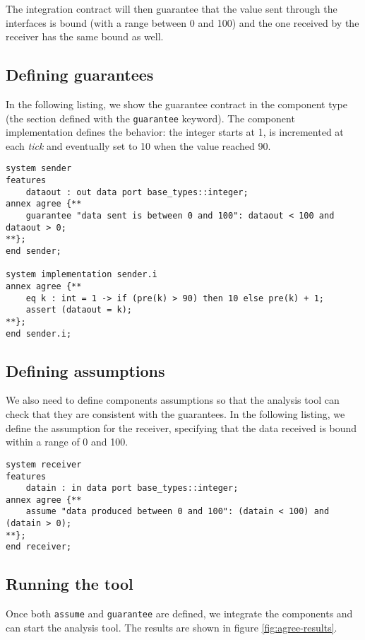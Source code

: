 \documentclass[times, 10pt]{article}
\begin{document}
The integration contract will then guarantee that the value sent through
the interfaces is bound (with a range between 0 and 100) and the one received
by the receiver has the same bound as well.

    \subsection{Defining guarantees}
    In the following listing, we show the guarantee contract in the component type
    (the section defined with the \texttt{guarantee} keyword). The component
    implementation defines the behavior: the integer starts at 1, is incremented at
    each \textit{tick} and eventually set to 10 when the value reached 90.

    \begin{lstlisting}
system sender
features
    dataout : out data port base_types::integer;
annex agree {**
    guarantee "data sent is between 0 and 100": dataout < 100 and dataout > 0;
**};
end sender;

system implementation sender.i
annex agree {**
    eq k : int = 1 -> if (pre(k) > 90) then 10 else pre(k) + 1;
    assert (dataout = k);
**};
end sender.i;
\end{lstlisting}



    \subsection{Defining assumptions}
    We also need to define components assumptions so that the analysis tool
    can check that they are consistent with the guarantees. In the following
    listing, we define the assumption for the receiver, specifying that the
    data received is bound within a range of 0 and 100.
\begin{lstlisting}
system receiver
features
	datain : in data port base_types::integer;
annex agree {**
	assume "data produced between 0 and 100": (datain < 100) and (datain > 0);
**};
end receiver;
\end{lstlisting}

    \subsection{Running the tool}
    Once both \texttt{assume} and \texttt{guarantee} are defined, we integrate
    the components and can start the analysis tool. The results are shown in
    figure \ref{fig:agree-results}.
\end{document}
